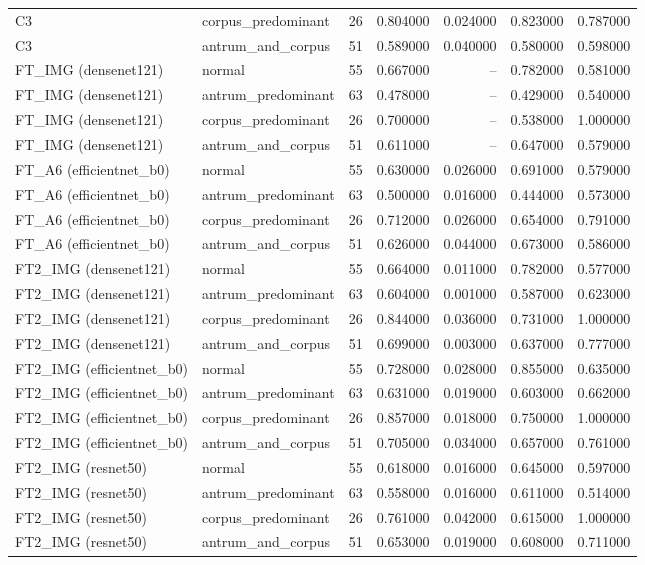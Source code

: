 \begin{table}
\begin{tabular}{llrrrrr}
C3 & corpus\_predominant & 26 & 0.804000 & 0.024000 & 0.823000 & 0.787000 \\
C3 & antrum\_and\_corpus & 51 & 0.589000 & 0.040000 & 0.580000 & 0.598000 \\
FT\_IMG (densenet121) & normal & 55 & 0.667000 & -- & 0.782000 & 0.581000 \\
FT\_IMG (densenet121) & antrum\_predominant & 63 & 0.478000 & -- & 0.429000 & 0.540000 \\
FT\_IMG (densenet121) & corpus\_predominant & 26 & 0.700000 & -- & 0.538000 & 1.000000 \\
FT\_IMG (densenet121) & antrum\_and\_corpus & 51 & 0.611000 & -- & 0.647000 & 0.579000 \\
FT\_A6 (efficientnet\_b0) & normal & 55 & 0.630000 & 0.026000 & 0.691000 & 0.579000 \\
FT\_A6 (efficientnet\_b0) & antrum\_predominant & 63 & 0.500000 & 0.016000 & 0.444000 & 0.573000 \\
FT\_A6 (efficientnet\_b0) & corpus\_predominant & 26 & 0.712000 & 0.026000 & 0.654000 & 0.791000 \\
FT\_A6 (efficientnet\_b0) & antrum\_and\_corpus & 51 & 0.626000 & 0.044000 & 0.673000 & 0.586000 \\
FT2\_IMG (densenet121) & normal & 55 & 0.664000 & 0.011000 & 0.782000 & 0.577000 \\
FT2\_IMG (densenet121) & antrum\_predominant & 63 & 0.604000 & 0.001000 & 0.587000 & 0.623000 \\
FT2\_IMG (densenet121) & corpus\_predominant & 26 & 0.844000 & 0.036000 & 0.731000 & 1.000000 \\
FT2\_IMG (densenet121) & antrum\_and\_corpus & 51 & 0.699000 & 0.003000 & 0.637000 & 0.777000 \\
FT2\_IMG (efficientnet\_b0) & normal & 55 & 0.728000 & 0.028000 & 0.855000 & 0.635000 \\
FT2\_IMG (efficientnet\_b0) & antrum\_predominant & 63 & 0.631000 & 0.019000 & 0.603000 & 0.662000 \\
FT2\_IMG (efficientnet\_b0) & corpus\_predominant & 26 & 0.857000 & 0.018000 & 0.750000 & 1.000000 \\
FT2\_IMG (efficientnet\_b0) & antrum\_and\_corpus & 51 & 0.705000 & 0.034000 & 0.657000 & 0.761000 \\
FT2\_IMG (resnet50) & normal & 55 & 0.618000 & 0.016000 & 0.645000 & 0.597000 \\
FT2\_IMG (resnet50) & antrum\_predominant & 63 & 0.558000 & 0.016000 & 0.611000 & 0.514000 \\
FT2\_IMG (resnet50) & corpus\_predominant & 26 & 0.761000 & 0.042000 & 0.615000 & 1.000000 \\
FT2\_IMG (resnet50) & antrum\_and\_corpus & 51 & 0.653000 & 0.019000 & 0.608000 & 0.711000 \\
\bottomrule
\end{tabular}
\end{table}
